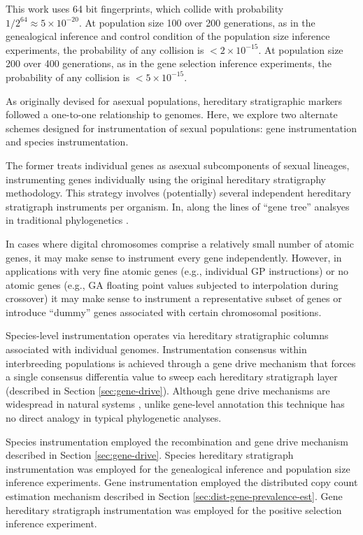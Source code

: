This work uses 64 bit fingerprints, which collide with probability $1/2^{64} \approx 5 \times 10^{-20}$.
At population size 100 over 200 generations, as in the genealogical inference and control condition of the population size inference experiments, the probability of any collision is $< 2 \times 10^{-15}$.
At population size 200 over 400 generations, as in the gene selection inference experiments, the probability of any collision is $< 5 \times 10^{-15}$.

As originally devised for asexual populations, hereditary stratigraphic markers followed a one-to-one relationship to genomes.
Here, we explore two alternate schemes designed for instrumentation of sexual populations: gene instrumentation and species instrumentation.

The former treats individual genes as asexual subcomponents of sexual lineages, instrumenting genes individually using the original hereditary stratigraphy methodology.
This strategy involves (potentially) several independent hereditary stratigraph instruments per organism.
In, along the lines of ``gene tree'' analsyes in traditional phylogenetics \citep{avise1989gene}.

In cases where digital chromosomes comprise a relatively small number of atomic genes, it may make sense to instrument every gene independently.
However, in applications with very fine atomic genes (e.g., individual GP instructions) or no atomic genes (e.g., GA floating point values subjected to interpolation during crossover) it may make sense to instrument a representative subset of genes or introduce ``dummy'' genes associated with certain chromosomal positions.

Species-level instrumentation operates via hereditary stratigraphic columns associated with individual genomes.
Instrumentation consensus within interbreeding populations is achieved through a gene drive mechanism that forces a single consensus differentia value to sweep each hereditary stratigraph layer (described in Section \ref{sec:gene-drive}).
Although gene drive mechanisms are widespread in natural systems \citep{alphey2020standardizing, price2020resistance}, unlike gene-level annotation this technique has no direct analogy in typical phylogenetic analyses.

Species instrumentation employed the recombination and gene drive mechanism described in Section \ref{sec:gene-drive}.
Species hereditary stratigraph instrumentation was employed for the genealogical inference and population size inference experiments.
Gene instrumentation employed the distributed copy count estimation mechanism described in Section \ref{sec:dist-gene-prevalence-est}.
Gene hereditary stratigraph instrumentation was employed for the positive selection inference experiment.

